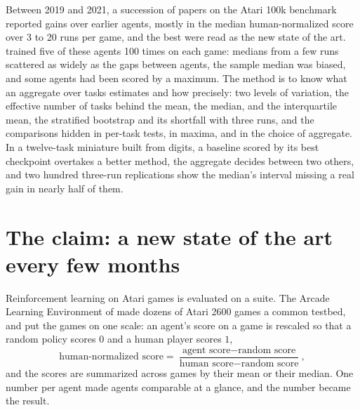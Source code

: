 \begin{refsection}

\newcommand{\aggregatesJeff}{J_{\mathrm{eff}}}
\newcommand{\aggregatesOG}{\mathrm{OG}}

\begin{chaptersummary}
Between 2019 and 2021, a succession of papers on the Atari 100k benchmark reported gains over earlier agents, mostly in the median human-normalized score over 3 to 20 runs per game, and the best were read as the new state of the art. \Textcite{AgarwalEtAl2021} trained five of these agents 100 times on each game: medians from a few runs scattered as widely as the gaps between agents, the sample median was biased, and some agents had been scored by a maximum. The method is to know what an aggregate over tasks estimates and how precisely: two levels of variation, the effective number of tasks behind the mean, the median, and the interquartile mean, the stratified bootstrap and its shortfall with three runs, and the comparisons hidden in per-task tests, in maxima, and in the choice of aggregate. In a twelve-task miniature built from digits, a baseline scored by its best checkpoint overtakes a better method, the aggregate decides between two others, and two hundred three-run replications show the median's interval missing a real gain in nearly half of them.
\end{chaptersummary}

\section{The claim: a new state of the art every few months}\label{sec:aggregates:claim}

Reinforcement learning on Atari games is evaluated on a suite. The Arcade Learning Environment of \textcite{BellemareEtAl2013} made dozens of Atari 2600 games a common testbed, and \textcite{MnihEtAl2015} put the games on one scale: an agent's score on a game is rescaled so that a random policy scores $0$ and a human player scores $1$,
\[
  \text{human-normalized score}=\frac{\text{agent score}-\text{random score}}{\text{human score}-\text{random score}} ,
\]
and the scores are summarized across games by their mean or their median. One number per agent made agents comparable at a glance, and the number became the result.


\end{refsection}
